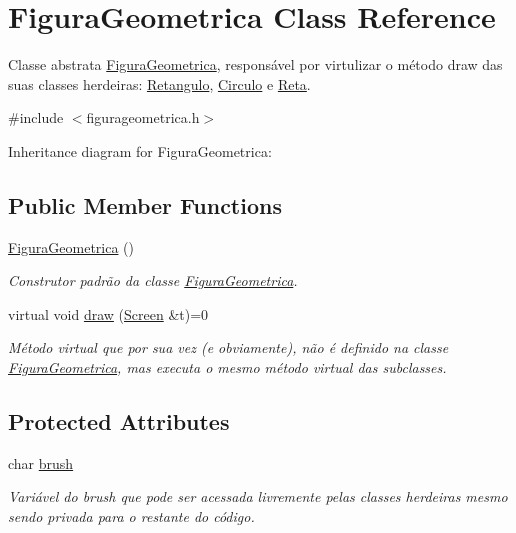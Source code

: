 \hypertarget{class_figura_geometrica}{}\section{Figura\+Geometrica Class Reference}
\label{class_figura_geometrica}


Classe abstrata \hyperlink{class_figura_geometrica}{Figura\+Geometrica}, responsável por virtulizar o método draw das suas classes herdeiras\+: \hyperlink{class_retangulo}{Retangulo}, \hyperlink{class_circulo}{Circulo} e \hyperlink{class_reta}{Reta}.  




{\ttfamily \#include $<$figurageometrica.\+h$>$}



Inheritance diagram for Figura\+Geometrica\+:
\subsection*{Public Member Functions}
\begin{DoxyCompactItemize}
\item 
\mbox{\label{class_figura_geometrica_a81d7c7efaea511e60a15f5a363138dd9}} 
\hyperlink{class_figura_geometrica_a81d7c7efaea511e60a15f5a363138dd9}{Figura\+Geometrica} ()
\begin{DoxyCompactList}\small\item\em Construtor padrão da classe \hyperlink{class_figura_geometrica}{Figura\+Geometrica}. \end{DoxyCompactList}\item 
\mbox{\label{class_figura_geometrica_a06404670d06d28d12f5f386901186925}} 
virtual void \hyperlink{class_figura_geometrica_a06404670d06d28d12f5f386901186925}{draw} (\hyperlink{class_screen}{Screen} \&t)=0
\begin{DoxyCompactList}\small\item\em Método virtual que por sua vez (e obviamente), não é definido na classe \hyperlink{class_figura_geometrica}{Figura\+Geometrica}, mas executa o mesmo método virtual das subclasses. \end{DoxyCompactList}\end{DoxyCompactItemize}
\subsection*{Protected Attributes}
\begin{DoxyCompactItemize}
\item 
\mbox{\label{class_figura_geometrica_a7b835ffcb2f0ef57432167f997c75b8b}} 
char \hyperlink{class_figura_geometrica_a7b835ffcb2f0ef57432167f997c75b8b}{brush}
\begin{DoxyCompactList}\small\item\em Variável do brush que pode ser acessada livremente pelas classes herdeiras mesmo sendo privada para o restante do código. \end{DoxyCompactList}\end{DoxyCompactItemize}


